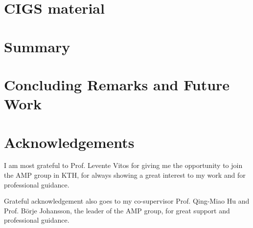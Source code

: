 \documentclass[a4paper, 12pt, titlepage,oneside,drop]{kthesis}
\begin{document}

\chapter{CIGS material}


\chapter{Summary}



\chapter{Concluding Remarks and Future Work}


\chapter*{Acknowledgements} 

I am most grateful to Prof. Levente Vitos for giving me the
opportunity to join the AMP group in KTH, for always showing a great interest
to my work and for professional guidance.

Grateful acknowledgement also goes to my co-supervisor Prof. Qing-Miao Hu and Prof.
B\"orje Johansson, the leader of the AMP group, for great support and professional guidance.
\end{document}
